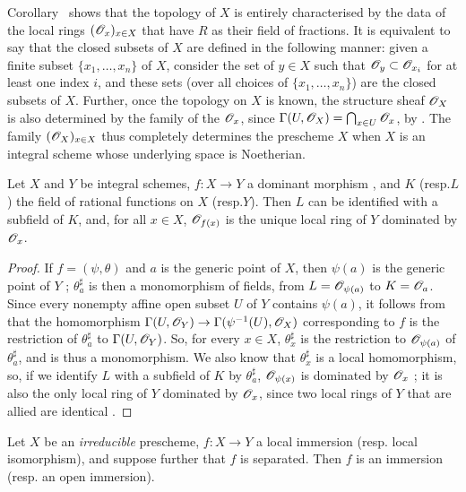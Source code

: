 \begin{env}[8.2.6]
\label{1.8.2.6}
Corollary~ shows that the topology of $X$ is entirely characterised by the data of the local rings $(\mathscr{O}_x)_{x\in X}$ that have $R$ as their field of fractions.
It is equivalent to say that the closed subsets of $X$ are defined in the following manner: given a finite subset $\{x_1,\ldots,x_n\}$ of $X$, consider the set of $y\in X$ such that $\mathscr{O}_y\subset\mathscr{O}_{x_i}$ for at least one index $i$, and these sets (over all choices of $\{x_1,\ldots,x_n\}$) are the closed subsets of $X$.
Further, once the topology on $X$ is known, the structure sheaf $\mathscr{O}_X$ is also determined by the family of the $\mathscr{O}_x$, since $\Gamma(U,\mathscr{O}_X)=\bigcap_{x\in U}\mathscr{O}_x$, by .
The family $(\mathscr{O}_X)_{x\in X}$ thus completely determines the prescheme $X$ when $X$ is an integral scheme whose underlying space is Noetherian.
\end{env}

\begin{prop}[8.2.7]
\label{1.8.2.7}
Let $X$ and $Y$ be integral schemes, $f:X\to Y$ a dominant morphism , and $K$ (resp.$L$) the field of rational functions on $X$ (resp.$Y$).
Then $L$ can be identified with a subfield of $K$, and, for all $x\in X$, $\mathscr{O}_{f(x)}$ is the unique local ring of $Y$ dominated by $\mathscr{O}_x$.
\end{prop}

\begin{proof}
\label{proof-1.8.2.7}
If $f=(\psi,\theta)$ and $a$ is the generic point of $X$, then $\psi(a)$ is the generic point of $Y$ ;
$\theta_a^\sharp$ is then a monomorphism of fields, from $L=\mathscr{O}_{\psi(a)}$ to $K=\mathscr{O}_a$.
Since every nonempty affine open subset $U$ of $Y$ contains $\psi(a)$, it follows from  that the homomorphism $\Gamma(U,\OO_Y)\to\Gamma(\psi^{-1}(U),\OO_X)$ corresponding to $f$ is the restriction of $\theta_a^\sharp$ to $\Gamma(U,\mathscr{O}_Y)$.
So, for every $x\in X$, $\theta_x^\sharp$ is the restriction to $\mathscr{O}_{\psi(a)}$ of $\theta_a^\sharp$, and is thus a monomorphism.
We also know that $\theta_x^\sharp$ is a local homomorphism, so, if we identify $L$ with a subfield of $K$ by $\theta_a^\sharp$, $\mathscr{O}_{\psi(x)}$ is dominated by $\mathscr{O}_x$ ;
it is also the only local ring of $Y$ dominated by $\mathscr{O}_x$, since two local rings of $Y$ that are allied are identical .
\end{proof}

\begin{prop}[8.2.8]
\label{1.8.2.8}
Let $X$ be an \emph{irreducible} prescheme, $f:X\to Y$ a local immersion (resp. local isomorphism), and suppose further that $f$ is separated. Then $f$ is an immersion (resp. an open immersion).
\end{prop}

